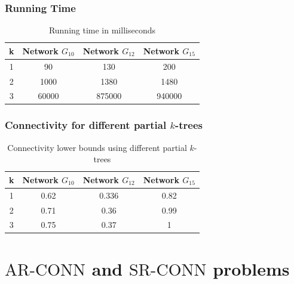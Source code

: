 \documentclass{beamer}
\newcommand{\ARCONN}   { {\mathrm {AR\mbox{-}CONN}} }
\newcommand{\SRCONN}   { {\mathrm {SR\mbox{-}CONN}} }
\begin{document}
\begin{frame}
\frametitle{Running Time}
\begin{table}[!htb]

   
      \centering
     \begin{tabular}{|c|c|c|c|}
     \hline
         k& Network $G_{10}$ & Network $G_{12}$ & Network $G_{15}$ \\
     \hline
     1&90& 130& 200 \\\hline
     2&1000 &1380&1480	\\\hline
3 &60000&875000&940000	 \\\hline
\end{tabular}
 \caption{Running time in milliseconds}
\label{Tab:runtym}
\end{table}

\end{frame}

\begin{frame}
\frametitle{Connectivity for different partial $k$-trees}
\begin{table}[!htb] 
      \centering
     \begin{tabular}{|c|c|c|c|}
     \hline
      k& Network $G_{10}$ & Network $G_{12}$ & Network $G_{15}$ \\
     \hline
      1 & 0.62&0.336& 0.82 \\\hline
2 &0.71 & 0.36& 0.99\\\hline
3 &0.75& 0.37& 1\\\hline
\end{tabular}
 \caption{Connectivity lower bounds using different partial $k$-trees}
 \label{Tab:acc}
\end{table}
\end{frame}
\section{$\ARCONN$ and $\SRCONN$ problems}
%
\end{document}
